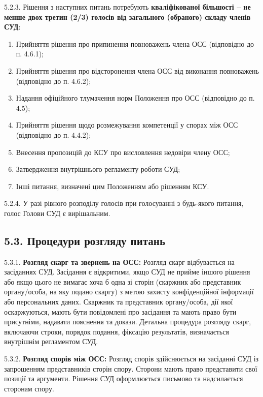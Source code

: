     5.2.3. Рішення з наступних питань потребують \textbf{кваліфікованої більшості – не менше двох третин (2/3) голосів від загального (обраного) складу членів СУД}:
        \begin{enumerate}[label=\alph*)]
            \item Прийняття рішення про припинення повноважень члена ОСС (відповідно до п. 4.6.1);
            \item Прийняття рішення про відсторонення члена ОСС від виконання повноважень (відповідно до п. 4.6.2);
            \item Надання офіційного тлумачення норм Положення про ОСС (відповідно до п. 4.5);
            \item Прийняття рішення щодо розмежування компетенції у спорах між ОСС (відповідно до п. 4.4.2);
            \item Внесення пропозицій до КСУ про висловлення недовіри члену ОСС;
            \item Затвердження внутрішнього регламенту роботи СУД;
            \item Інші питання, визначені цим Положенням або рішенням КСУ.
        \end{enumerate}

    5.2.4. У разі рівного розподілу голосів при голосуванні з будь-якого питання, голос Голови СУД є вирішальним.

\subsection*{5.3. Процедури розгляду питань}
    5.3.1. \textbf{Розгляд скарг та звернень на ОСС:} Розгляд скарг відбувається на засіданнях СУД. Засідання є відкритими, якщо СУД не прийме іншого рішення або якщо цього не вимагає хоча б одна зі сторін (скаржник або представник органу/особа, на яку подано скаргу) з метою захисту конфіденційної інформації або персональних даних. Скаржник та представник органу/особа, дії якої оскаржуються, мають бути повідомлені про засідання та мають право бути присутніми, надавати пояснення та докази. Детальна процедура розгляду скарг, включаючи строки, порядок подання, фіксацію результатів, визначається внутрішнім регламентом СУД.

    5.3.2. \textbf{Розгляд спорів між ОСС:} Розгляд спорів здійснюється на засіданні СУД із запрошенням представників сторін спору. Сторони мають право представити свої позиції та аргументи. Рішення СУД оформлюється письмово та надсилається сторонам спору.

